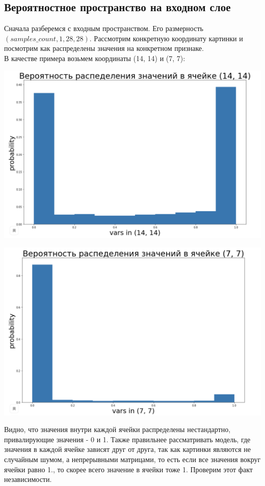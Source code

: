 \subsection{Вероятностное пространство на входном слое}
Сначала разберемся с входным пространством. Его размерность $(samples\_count, 1, 28, 28)$. Рассмотрим конкретную координату картинки и посмотрим как распределены значения на конкретном признаке. \\
В качестве примера возьмем координаты (14, 14) и (7, 7):
\begin{center}
    \includegraphics[scale=0.4]{images/x_(14, 14).png}
\end{center}
\begin{center}
    \includegraphics[scale=0.4]{images/x_(7, 7).png}
\end{center}
Видно, что значения внутри каждой ячейки распределены нестандартно, привалирующие значения - 0 и 1. Также правильнее рассматривать модель, где значения в каждой ячейке зависят друг от друга, так как картинки являются не случайным шумом, а непрерывными матрицами, то есть если все значения вокруг ячейки равно 1., то скорее всего значение в ячейки тоже 1. Проверим этот факт независимости. \\
